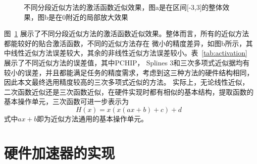 \begin{figure}[htbp]
	\centering
	\caption{不同分段近似方法的激活函数近似效果，图a是在区间[-3,3]的整体效果，图b是在0附近的局部放大效果}
\label{fig:activationErr}
\end{figure}


图~\ref{fig:activationErr} 展示了不同分段近似方法的激活函数近似效果。整体而言，所有的近似方法都能较好的贴合激活函数，不同的近似方法存在
微小的精度差异，如图b所示，其中线性近似方法误差较大，其余的非线性近似方法误差较小。表~\ref{tab:activation} 展示了不同近似方法的误差值，其中PCHIP，
Splines 3和三次多项式近似据均有较小的误差，并且都能满足任务的精度需求，考虑到这三种方法的硬件结构相同，因此本文最终选用精度较高的三次多项式近似的方法。
实际上，无论线性近似，二次函数近似还是三次函数近似，在硬件实现时都有相似的基本结构，提取函数的基本操作单元，三次函数可进一步表示为
\begin{equation}
H(x) = x(x(ax+b)+c) + d
\end{equation}
式中\(ax+b\)即为近似方法通用的基本操作单元。

\vspace{-4em}
\section{硬件加速器的实现}


